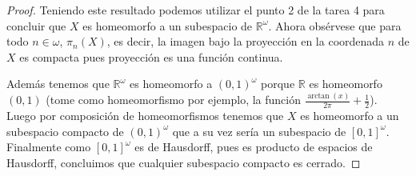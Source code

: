 \documentclass[letter,twoside,12pt]{article}
\begin{document}
\begin{enumerate}
\begin{proof}
Teniendo este resultado podemos utilizar el punto 2 de la tarea 4 para concluir que $ X $ es homeomorfo a un subespacio de $ \mathbb{R}^\omega $.
Ahora obsérvese que para todo $ n \in \omega $, $ \pi_n(X) $, es decir, la imagen bajo la proyección en la coordenada $ n $ de $ X $ es compacta pues proyección es una función continua.    
 

Además tenemos que $ \mathbb{R}^{\omega} $ es homeomorfo a $ (0,1)^{\omega} $ porque $ \mathbb{R} $ es homeomorfo $ (0,1) $ (tome como homeomorfismo por ejemplo, la función $ \frac{\arctan(x)}{2\pi} + \frac{1}{2}$). Luego por composición de homeomorfismos tenemos que $ X $ es homeomorfo a un subespacio compacto de $ (0,1)^\omega $ que a su vez sería un subespacio de $ [0,1]^{\omega} $. Finalmente como $ [0,1]^{\omega} $ es de Hausdorff, pues es producto de espacios de Hausdorff, concluimos que cualquier subespacio compacto es cerrado.
\end{proof}

\end{enumerate}
\end{document}
